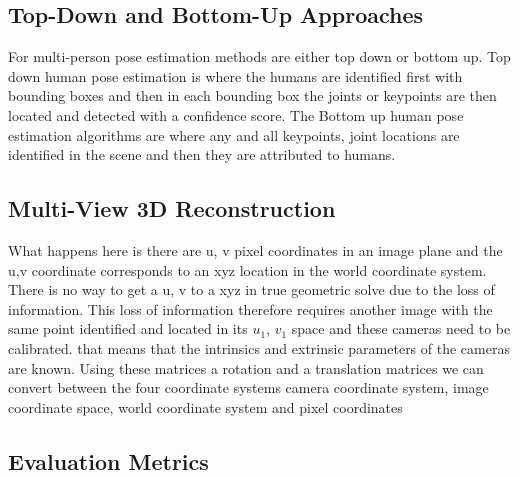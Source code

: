 \subsection{Top-Down and Bottom-Up Approaches}
For multi-person pose estimation methods are either top down or bottom up.
Top down human pose estimation is where the humans are identified first with bounding boxes and then in each bounding box the joints or keypoints are then located and detected with a confidence score.
The Bottom up human pose estimation algorithms are where any and all keypoints, joint locations are identified in the scene and then they are attributed to humans.


\subsection{Multi-View 3D Reconstruction}

What happens here is there are u, v pixel coordinates in an image plane and the u,v coordinate corresponds to an xyz location in the world coordinate system. There is no way to get a u, v to a xyz in true geometric solve due to the loss of information. 
This loss of information therefore requires another image with the same point identified and located in its $u_1$, $v_1$ space and these cameras need to be calibrated. that means that the intrinsics and extrinsic parameters of the cameras are known. 
Using these matrices a rotation and a translation matrices we can convert between the four coordinate systems camera coordinate system, image coordinate space, world coordinate system and pixel coordinates 


\subsection{Evaluation Metrics}


